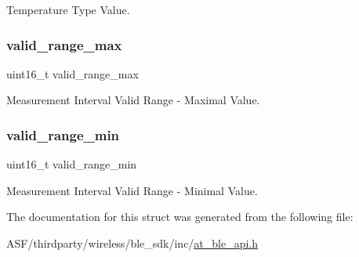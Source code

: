 Temperature Type Value. 

\mbox{\label{structat__ble__htpt__db__cfg_a3684ac35d7423febfda2abfc9333d36a}} 
\subsubsection{\texorpdfstring{valid\_range\_max}{valid\_range\_max}}
{\footnotesize\ttfamily uint16\+\_\+t valid\+\_\+range\+\_\+max}



Measurement Interval Valid Range -\/ Maximal Value. 

\mbox{\label{structat__ble__htpt__db__cfg_a2224870093f4e135fcbf23688840e9a3}} 
\subsubsection{\texorpdfstring{valid\_range\_min}{valid\_range\_min}}
{\footnotesize\ttfamily uint16\+\_\+t valid\+\_\+range\+\_\+min}



Measurement Interval Valid Range -\/ Minimal Value. 



The documentation for this struct was generated from the following file\+:\begin{DoxyCompactItemize}
\item 
A\+S\+F/thirdparty/wireless/ble\+\_\+sdk/inc/\mbox{\hyperlink{at__ble__api_8h}{at\+\_\+ble\+\_\+api.\+h}}\end{DoxyCompactItemize}
